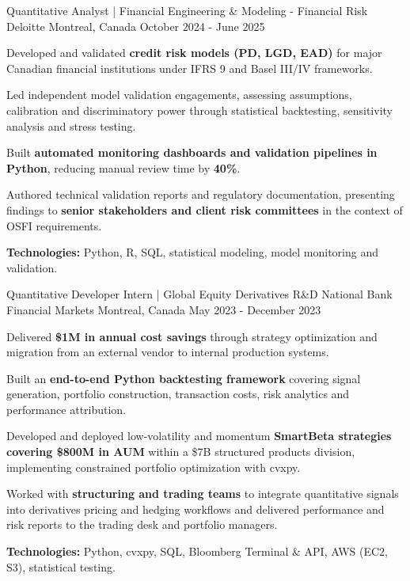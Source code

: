 \begin{cventries}
  \cventry
    {Quantitative Analyst | Financial Engineering \& Modeling - Financial Risk}
    {Deloitte}
    {Montreal, Canada}
    {October 2024 - June 2025}
    {
      \begin{cvitems}
        \item{Developed and validated \textbf{credit risk models (PD, LGD, EAD)} for major Canadian financial institutions under IFRS 9 and Basel III/IV frameworks.}
        \item{Led independent model validation engagements, assessing assumptions, calibration and discriminatory power through statistical backtesting, sensitivity analysis and stress testing.}
        \item{Built \textbf{automated monitoring dashboards and validation pipelines in Python}, reducing manual review time by \textbf{40\%}.}
        \item{Authored technical validation reports and regulatory documentation, presenting findings to \textbf{senior stakeholders and client risk committees} in the context of OSFI requirements.}
        \item{\textbf{Technologies:} Python, R, SQL, statistical modeling, model monitoring and validation.}
      \end{cvitems}
    }

  \cventry
    {Quantitative Developer Intern | Global Equity Derivatives R\&D}
    {National Bank Financial Markets}
    {Montreal, Canada}
    {May 2023 - December 2023}
    {
      \begin{cvitems}
        \item{Delivered \textbf{\$1M in annual cost savings} through strategy optimization and migration from an external vendor to internal production systems.}
        \item{Built an \textbf{end-to-end Python backtesting framework} covering signal generation, portfolio construction, transaction costs, risk analytics and performance attribution.}
        \item{Developed and deployed low-volatility and momentum \textbf{SmartBeta strategies covering \$800M in AUM} within a \$7B structured products division, implementing constrained portfolio optimization with cvxpy.}
        \item{Worked with \textbf{structuring and trading teams} to integrate quantitative signals into derivatives pricing and hedging workflows and delivered performance and risk reports to the trading desk and portfolio managers.}
        \item{\textbf{Technologies:} Python, cvxpy, SQL, Bloomberg Terminal \& API, AWS (EC2, S3), statistical testing.}
      \end{cvitems}
    }


\end{cventries}
